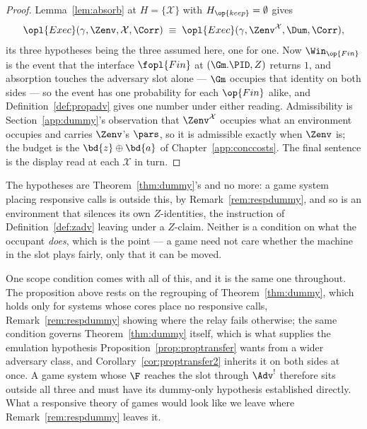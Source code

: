 \documentclass[10pt,oneside,openany]{book}
\theoremstyle{accentdef}
\theoremstyle{accentplain}
\begin{document}
\begin{proof}
Lemma~\ref{lem:absorb} at $H = \{\mathcal{X}\}$ with $H_{\op{keep}} = \emptyset$ gives
\[
  \opl{Exec}(\gamma,\Zenv,\mathcal{X},\Corr)
  \;\equiv\;
  \opl{Exec}(\gamma,\Zenv^{\mathcal{X}},\Dum,\Corr) ,
\]
its three hypotheses being the three assumed here, one for one.
Now $\Win_{\op{Fin}}$ is the event that the interface $\fopl{Fin}$ at $(\Gm.\PID,Z)$ returns $1$, and
absorption touches the
adversary slot alone --- $\Gm$ occupies that identity on both sides --- so the event has one
probability for each $\op{Fin}$ alike, and Definition~\ref{def:propadv} gives one number under
either reading. Admissibility is
Section~\ref{app:dummy}'s observation that $\Zenv^{\mathcal{X}}$ occupies what an environment occupies
and carries $\Zenv$'s $\pars$, so it is admissible exactly when $\Zenv$ is; the budget is the
$\bd{z} \oplus \bd{a}$ of Chapter~\ref{app:conccosts}. The final sentence is the display read at each
$\mathcal{X}$ in turn.
\end{proof}

The hypotheses are Theorem~\ref{thm:dummy}'s and no more: a game system placing responsive calls is
outside this, by Remark~\ref{rem:respdummy}, and so is an environment that silences its own
$Z$-identities, the instruction of Definition~\ref{def:zadv} leaving under a $Z$-claim. Neither is a
condition on what the occupant \emph{does}, which is the point --- a game need not care whether the
machine in the slot plays fairly, only that it can be moved.

One scope condition comes with all of this, and it is the same one throughout. The proposition above
rests on the regrouping of Theorem~\ref{thm:dummy}, which holds only for systems whose cores place no
responsive calls, Remark~\ref{rem:respdummy} showing where the relay fails otherwise; the same
condition governs Theorem~\ref{thm:dummy} itself, which is what supplies the emulation hypothesis
Proposition~\ref{prop:proptransfer} wants from a wider adversary class, and
Corollary~\ref{cor:proptransfer2} inherits it on both sides at once. A game system whose $\F$ reaches
the slot through $\Adv^{!}$ therefore sits outside all three and must have its dummy-only hypothesis
established directly. What a responsive theory of games would look like we leave where
Remark~\ref{rem:respdummy} leaves it.
\end{document}

